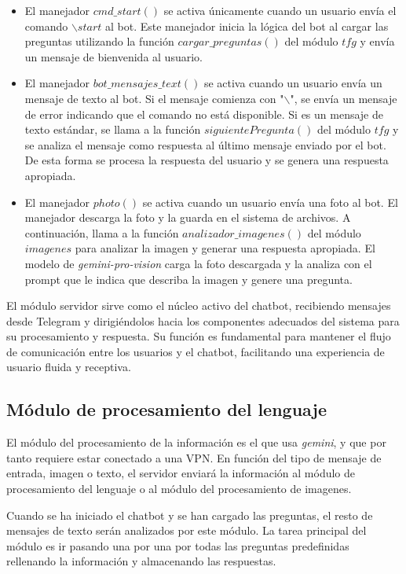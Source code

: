 \begin{itemize}
	\item El manejador $cmd\_start()$ se activa únicamente cuando un usuario envía el comando $\backslash start$ al bot. Este manejador inicia la lógica del bot al cargar las preguntas utilizando la función $cargar\_preguntas()$ del módulo $tfg$ y envía un mensaje de bienvenida al usuario.
	
	\item El manejador $bot\_mensajes\_text()$ se activa cuando un usuario envía un mensaje de texto al bot. Si el mensaje comienza con "$\backslash$", se envía un mensaje de error indicando que el comando no está disponible. Si es un mensaje de texto estándar, se llama a la función $siguientePregunta()$ del módulo $tfg$ y se analiza el mensaje como respuesta al último mensaje enviado por el bot. De esta forma se procesa la respuesta del usuario y se genera una respuesta apropiada.
	
	\item El manejador $photo()$ se activa cuando un usuario envía una foto al bot. El manejador descarga la foto y la guarda en el sistema de archivos. A continuación, llama a la función $analizador\_imagenes()$ del módulo $imagenes$ para analizar la imagen y generar una respuesta apropiada. El modelo de \textit{gemini-pro-vision} carga la foto descargada y la analiza con el prompt que le indica que describa la imagen y genere una pregunta. 
\end{itemize}

El módulo servidor sirve como el núcleo activo del chatbot, recibiendo mensajes desde Telegram y dirigiéndolos hacia los componentes adecuados del sistema para su procesamiento y respuesta. Su función es fundamental para mantener el flujo de comunicación entre los usuarios y el chatbot, facilitando una experiencia de usuario fluida y receptiva. 

\subsection{Módulo de procesamiento del lenguaje}
El módulo del procesamiento de la información es el que usa \textit{gemini}, y que por tanto requiere estar conectado a una VPN. En función del tipo de mensaje de entrada, imagen o texto, el servidor enviará la información al módulo de procesamiento del lenguaje o al módulo del procesamiento de imagenes.

Cuando se ha iniciado el chatbot y se han cargado las preguntas, el resto de mensajes de texto serán analizados por este módulo. La tarea principal del módulo es ir pasando una por una por todas las preguntas predefinidas rellenando la información y almacenando las respuestas. 

